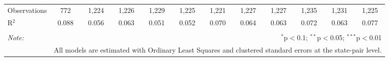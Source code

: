 \begin{table}[!htbp]
\begin{tabular}{@{\extracolsep{5pt}}lccccccccccc}
Observations & 772 & 1,224 & 1,226 & 1,229 & 1,225 & 1,221 & 1,227 & 1,227 & 1,235 & 1,231 & 1,225 \\ 
R$^{2}$ & 0.088 & 0.056 & 0.063 & 0.051 & 0.052 & 0.070 & 0.064 & 0.063 & 0.072 & 0.063 & 0.077 \\ 
\hline 
\hline \\[-1.8ex] 
\textit{Note:}  & \multicolumn{11}{r}{$^{*}$p$<$0.1; $^{**}$p$<$0.05; $^{***}$p$<$0.01} \\ 
 & \multicolumn{11}{r}{All models are estimated with Ordinary Least Squares and clustered standard errors at the state-pair level.} \\ 
\end{tabular} 
\end{table} 
